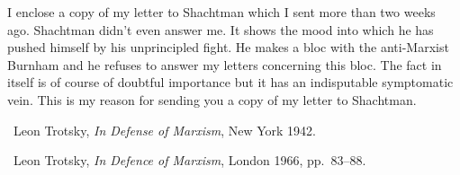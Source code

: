 \vspace*{-1 \baselineskip}
\triast
\vspace*{-1 \baselineskip}


\vspace*{-1\baselineskip}


I enclose a copy of my letter to Shachtman which I sent more than two weeks ago. Shachtman didn’t even answer me. It shows the mood into which he has pushed himself by his unprincipled fight. He makes a bloc with the anti-Marxist Burnham and he refuses to answer my letters concerning this bloc. The fact in itself is of course of doubtful importance but it has an indisputable symptomatic vein. This is my reason for sending you a copy of my letter to Shachtman.


\begin{letterinfo}
	\firstpublished\ Leon Trotsky, \emph{In Defense of Marxism}, New York 1942.
	
	\checkedagainst\ Leon Trotsky, \emph{In Defence of Marxism}, London 1966, pp.~83--88.
\end{letterinfo}

